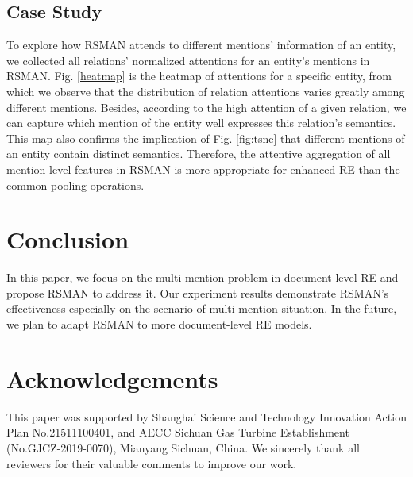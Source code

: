 \documentclass[11pt]{article}
\begin{document}
\subsection{Case Study}
To explore how RSMAN attends to different mentions' information of an entity, we collected all relations' normalized attentions for an entity's mentions in RSMAN. Fig. \ref{heatmap} is the heatmap of attentions for a specific entity, from which we observe that the distribution of relation attentions varies greatly among different mentions. Besides, according to the high attention of a given relation, we can capture which mention of the entity well expresses this relation's semantics. This map also confirms the implication of Fig. \ref{fig:tsne} that different mentions of an entity contain distinct semantics. Therefore, the attentive aggregation of all mention-level features in RSMAN is more appropriate for enhanced RE than the common pooling operations.


\section{Conclusion}

In this paper, we focus on the multi-mention problem in document-level RE and propose RSMAN to address it. Our experiment results
demonstrate RSMAN's effectiveness especially on the scenario of multi-mention situation. In the future, we plan to adapt RSMAN to more document-level RE models.

\section*{Acknowledgements}
This paper was supported by Shanghai Science and Technology Innovation Action Plan No.21511100401, and AECC Sichuan Gas Turbine Establishment (No.GJCZ-2019-0070), Mianyang Sichuan, China. We sincerely thank all reviewers for their valuable comments to improve our work.





\appendix
\end{document}
